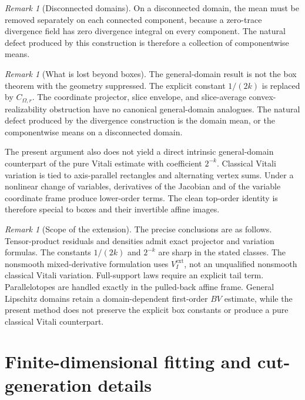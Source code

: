\documentclass[11pt,letterpaper]{article}
\theoremstyle{definition}
\theoremstyle{remark}
\newtheorem{remark}[theorem]{Remark}
\begin{document}
\begin{remark}[Disconnected domains]
\label{rem:appendix_disconnected_domains}
On a disconnected domain, the mean must be removed separately on each
connected component, because a zero-trace divergence field has zero divergence
integral on every component. The natural defect produced by this construction
is therefore a collection of componentwise means.
\end{remark}

\begin{remark}[What is lost beyond boxes]
\label{rem:appendix_what_is_lost_beyond_boxes}
The general-domain result is not the box theorem with the geometry suppressed.
The explicit constant $1/(2k)$ is replaced by $C_{\Omega,r}$. The coordinate
projector, slice envelope, and slice-average convex-realizability obstruction
have no canonical general-domain analogues. The natural defect produced by the
divergence construction is the domain mean, or the componentwise means on a
disconnected domain.

The present argument also does not yield a direct intrinsic general-domain
counterpart of the pure Vitali estimate with coefficient $2^{-k}$. Classical
Vitali variation is tied to axis-parallel rectangles and alternating vertex
sums. Under a nonlinear change of variables, derivatives of the Jacobian and
of the variable coordinate frame produce lower-order terms. The clean
top-order identity is therefore special to boxes and their invertible affine
images.
\end{remark}\begin{remark}[Scope of the extension]
\label{rem:appendix_scope_nonclaims}
The precise conclusions are as follows. Tensor-product residuals and densities
admit exact projector and variation formulas. The constants $1/(2k)$ and
$2^{-k}$ are sharp in the stated classes. The nonsmooth mixed-derivative formulation
uses $V_I^{\mathrm{ext}}$, not an unqualified nonsmooth classical Vitali
variation. Full-support laws require an explicit tail term. Parallelotopes are
handled exactly in the pulled-back affine frame. General Lipschitz domains
retain a domain-dependent first-order $BV$ estimate, while the present method
does not preserve the explicit box constants or produce a pure classical
Vitali counterpart.
\end{remark}


 
\section{Finite-dimensional fitting and cut-generation details}
\label{app:cut_generation}
 
\end{document}
